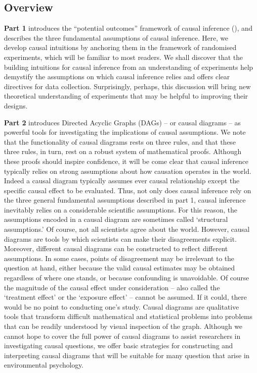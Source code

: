 \documentclass[
  singlecolumn]{article}
\begin{document}
\subsection{Overview}\label{overview}

\textbf{Part 1} introduces the ``potential outcomes'' framework of
causal inference (),
and describes the three fundamental assumptions of causal inference.
Here, we develop causal intuitions by anchoring them in the framework of
randomised experiments, which will be familiar to most readers. We shall
discover that the building intuitions for causal inference from an
understanding of experiments help demystify the assumptions on which
causal inference relies and offers clear directives for data collection.
Surprisingly, perhaps, this discussion will bring new theoretical
understanding of experiments that may be helpful to improving their
designs.

\textbf{Part 2} introduces Directed Acyclic Graphs (DAGs) -- or causal
diagrams -- as powerful tools for investigating the implications of
causal assumptions. We note that the functionality of causal diagrams
rests on three rules, and that these three rules, in turn, rest on a
robust system of mathematical proofs. Although these proofs should
inspire confidence, it will be come clear that causal inference
typically relies on strong assumptions about how causation operates in
the world. Indeed a causal diagram typically assumes ever causal
relationship except the specific causal effect to be evaluated. Thus,
not only does causal inference rely on the three general fundamental
assumptions described in part 1, causal inference inevitably relies on a
considerable scientific assumptions. For this reason, the assumptions
encoded in a causal diagram are sometimes called `structural
assumptions.' Of course, not all scientists agree about the world.
However, causal diagrams are tools by which scientists can make their
disagreements explicit. Moreover, different causal diagrams can be
constructed to reflect different assumptions. In some cases, points of
disagreement may be irrelevant to the question at hand, either because
the valid causal estimates may be obtained regardless of where one
stands, or because confounding is unavoidable. Of course the magnitude
of the causal effect under consideration -- also called the `treatment
effect' or the `exposure effect' -- cannot be assumed. If it could,
there would be no point to conducting one's study. Causal diagrams are
qualitative tools that transform difficult mathematical and statistical
problems into problems that can be readily understood by visual
inspection of the graph. Although we cannot hope to cover the full power
of causal diagrams to assist researchers in investigating causal
questions, we offer basic strategies for constructing and interpreting
causal diagrams that will be suitable for many question that arise in
environmental psychology.
\end{document}
